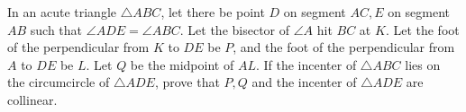 In an acute triangle $\triangle ABC$, let there be point $D$ on segment $AC, E$ on segment $AB$ such that $\angle ADE = \angle ABC$. Let the bisector of $\angle A$ hit $BC$ at $K$. Let the foot of the perpendicular from $K$ to $DE$ be $P$, and the foot of the perpendicular from $A$ to $DE$ be $L$. Let $Q$ be the midpoint of $AL$. If the incenter of $\triangle ABC$ lies on the circumcircle of $\triangle ADE$, prove that $P,Q$ and the incenter of  $\triangle ADE$ are collinear.